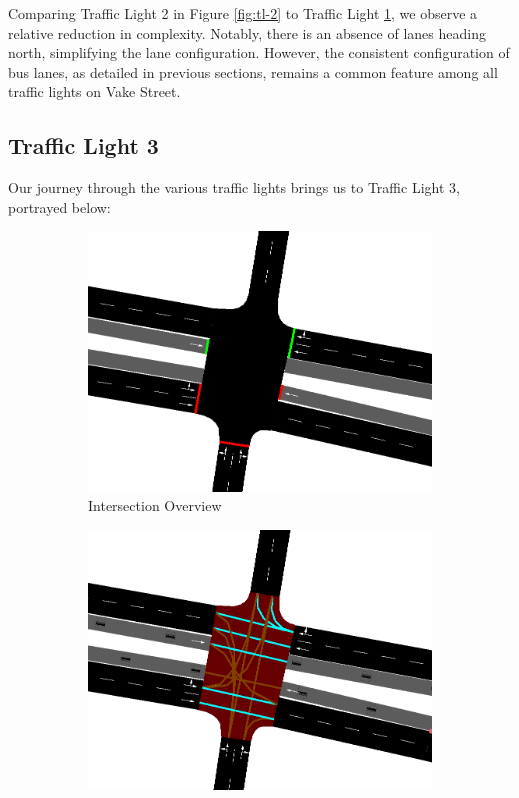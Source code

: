 Comparing Traffic Light 2 in Figure \ref{fig:tl-2} to Traffic Light \hyperref[sec:tl-1]{1}, we observe a relative reduction in complexity. Notably, there is an absence of lanes heading north, simplifying the lane configuration. However, the consistent configuration of bus lanes, as detailed in previous sections, remains a common feature among all traffic lights on Vake Street.

\newpage
\subsection{Traffic Light 3} \label{sec:tl-3}
Our journey through the various traffic lights brings us to Traffic Light 3, portrayed below:

\begin{figure}[h]
    \centering
    \begin{subfigure}{0.45\textwidth}
        \centering
        \includegraphics[width=\linewidth]{images/methodology/tl-3-street.png}
        \caption{Intersection Overview}
    \end{subfigure}
    \hfill
    \begin{subfigure}{0.45\textwidth}
        \centering
        \includegraphics[width=\linewidth]{images/methodology/tl-3-directions.png}

\end{subfigure}
\end{figure}
